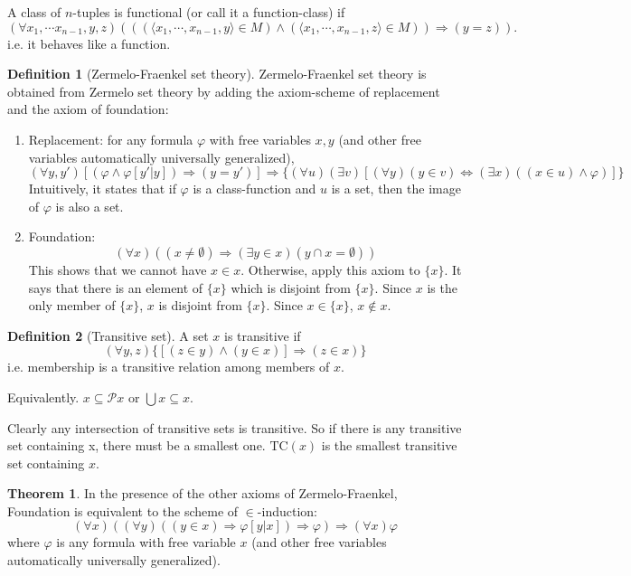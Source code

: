 \documentclass[a4paper]{article}
\theoremstyle{definition}
\newtheorem*{thm}{Theorem}
\newtheorem*{defi}{Definition}
\newcommand{\TC}{\mathrm{TC}}
\newcommand{\bra}{\langle}
\newcommand{\ket}{\rangle}
\begin{document}
A class of $n$-tuples is functional (or call it a function-class) if
\[
(\forall x_1, \cdots x_{n - 1}, y, z)(((\bra x_1, \cdots, x_{n - 1}, y\ket \in M)\wedge (\bra x_1, \cdots, x_{n - 1}, z\ket \in M))\Rightarrow (y = z)).
\]
i.e. it behaves like a function.
\begin{defi}[Zermelo-Fraenkel set theory]
  Zermelo-Fraenkel set theory is obtained from Zermelo set theory by adding the axiom-scheme of replacement and the axiom of foundation:
  \begin{enumerate}
  \item Replacement: for any formula $\varphi$ with free variables $x, y$ (and other free variables automatically universally generalized),
    \[
    (\forall y, y')[(\varphi \wedge \varphi[y'|y])\Rightarrow (y = y')]\Rightarrow \{(\forall u)(\exists v)[(\forall y)(y\in v)\Leftrightarrow (\exists x)((x\in u)\wedge \varphi)]\}
    \]
    Intuitively, it states that if $\varphi$ is a class-function and $u$ is a set, then the image of $\varphi$ is also a set.
  \item Foundation:
    \[
    (\forall x)((x\not= \emptyset)\Rightarrow (\exists y\in x)(y\cap x = \emptyset))
    \]
    This shows that we cannot have $x\in x$. Otherwise, apply this axiom to $\{x\}$. It says that there is an element of $\{x\}$ which is disjoint from $\{x\}$. Since $x$ is the only member of $\{x\}$, $x$ is disjoint from $\{x\}$. Since $x\in \{x\}$, $x\not\in x$.
  \end{enumerate}
\end{defi}

\begin{defi}[Transitive set]
  A set $x$ is transitive if
  \[
  (\forall y, z)\{[(z\in y)\wedge (y\in x)]\Rightarrow (z\in x)\}
  \]
  i.e. membership is a transitive relation among members of $x$.

  Equivalently. $x\subseteq \mathcal{P}x$ or $\bigcup x\subseteq x$.
\end{defi}

Clearly any intersection of transitive sets is transitive. So if there is any transitive set containing x, there must be a smallest one. $\TC(x)$ is the smallest transitive set containing $x$.

\begin{thm}
  In the presence of the other axioms of Zermelo-Fraenkel, Foundation is equivalent to the scheme of $\in$-induction:
\[
(\forall x)((\forall y)((y\in x)\Rightarrow \varphi[y|x])\Rightarrow \varphi)\Rightarrow (\forall x)\varphi
\]
where $\varphi$ is any formula with free variable $x$ (and other free variables automatically universally generalized).
\end{thm}
\end{document}
